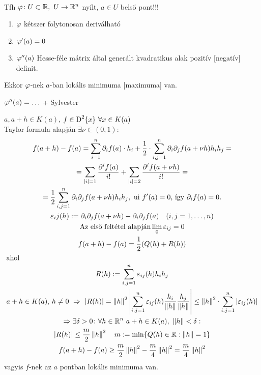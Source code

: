 \begin{te}\ \\
  Tfh $\varphi\colon U\subset\mathbb{R},\ U\to\mathbb{R}^n$ nyílt, $a\in U$ belső pont!!!
  {\listazjromai
    \begin{enumerate}
    \item $\varphi$ kétszer folytonosan deriválható
    \item $\varphi'(a)=0$
    \item $\varphi''(a)$ Hesse-féle mátrix által generált kvadratikus alak pozitív [negatív] definit.
    \end{enumerate}
}
Ekkor $\varphi$-nek $a$-ban lokális minimuma [maximuma] van.
\end{te}

\begin{megj} $\varphi''(a)=\ldots$ + Sylvester
\end{megj}
\begin{biz}$a,a+h\in K(a)$, $f\in\operatorname{D}^{2}\{x\}\ \forall x\in K(a)$\\
  Taylor-formula alapján $\exists \nu\in(0,1)$:
\begin{gather*}
  f(a+h)-f(a)=\sum_{i=1}^n\partial_if(a)\cdot h_i+\dfrac12\cdot\sum_{i,j=1}^n\partial_i\partial_jf(a+\nu h)h_ih_j=
  \\ = \sum_{|i|=1}\dfrac{\partial^i f(a)}{i!} + \sum_{|i|=2}\dfrac{\partial^i f(a+\nu h)}{i!} =\\
  =\dfrac12\sum_{i,j=1}^n\partial_i\partial_jf(a+\nu h)h_ih_j,\text{ ui }f'(a)=0\text{, így }\partial_if(a)=0.\\
  \varepsilon_ij(h):=\partial_i\partial_jf(a+\nu h)-\partial_i\partial_jf(a)\quad(i,j=1,\dotsc,n)\\
  \text{Az első feltétel alapján} \lim_0\varepsilon_{ij}=0\\
  f(a+h)-f(a)=\dfrac12(Q(h)+R(h))\\
  \intertext{ahol}
  R(h):=\sum_{i,j=1}^n\varepsilon_{ij}(h)h_ih_j\\
  a+h\in K(a),\, h\ne 0\ \Rightarrow\ \vert R(h)\vert=\left\Vert h\right\Vert^2\left\vert\sum_{i,j=1}^n\varepsilon_{ij}(h)\dfrac{h_i}{ 
    \left\Vert h\right\Vert}\dfrac{h_j}{\left\Vert h\right\Vert}\right\vert\leq\left\Vert h\right\Vert^2\cdot\sum_{i,j=1}^n|\varepsilon_{ij}(h)|\\
  \Rightarrow \exists \delta>0\colon \forall h\in\mathbb{R}^n\ a+h\in K(a),\  \left\Vert h\right\Vert<\delta:\\
  |R(h)|\leq \dfrac m2\left\Vert h\right\Vert^2\quad m:=\min\{Q(h)\in\mathbb{R}:\left\Vert h\right\Vert=1\}\\
  f(a+h)-f(a)\geq \frac m2\left\Vert h\right\Vert^2-\frac m4\left\Vert h\right\Vert^2=\frac m4\left\Vert h\right\Vert^2
\end{gather*}
vagyis $f$-nek az $a$ pontban lokális minimuma van.
\end{biz}

